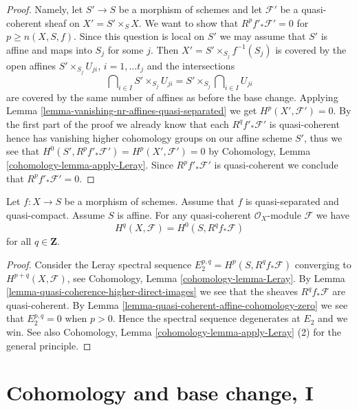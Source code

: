 \begin{proof}
\medskip\noindent
Namely, let $S' \to S$ be a morphism of schemes and let
$\mathcal{F}'$ be a quasi-coherent sheaf on $X' = S' \times_S X$.
We want to show that $R^pf'_*\mathcal{F}' = 0$ for $p \geq n(X, S, f)$.
Since this question is local on $S'$ we may assume that $S'$ is affine
and maps into $S_j$ for some $j$. Then $X' = S' \times_{S_j} f^{-1}(S_j)$
is covered by the open affines $S' \times_{S_j} U_{ji}$, $i = 1, \ldots t_j$
and the intersections
$$
\bigcap\nolimits_{i \in I} S' \times_{S_j} U_{ji} =
S' \times_{S_j} \bigcap\nolimits_{i \in I} U_{ji}
$$
are covered by the same number of affines as before the base change.
Applying
Lemma \ref{lemma-vanishing-nr-affines-quasi-separated}
we get $H^p(X', \mathcal{F}') = 0$. By the first part of the proof
we already know that each $R^qf'_*\mathcal{F}'$ is quasi-coherent
hence has vanishing higher cohomology groups on our affine scheme $S'$,
thus we see that $H^0(S', R^pf'_*\mathcal{F}') = H^p(X', \mathcal{F}') = 0$
by Cohomology, Lemma \ref{cohomology-lemma-apply-Leray}.
Since $R^pf'_*\mathcal{F}'$ is quasi-coherent
we conclude that $R^pf'_*\mathcal{F}' = 0$.
\end{proof}

\begin{lemma}
\label{lemma-quasi-coherence-higher-direct-images-application}
Let $f : X \to S$ be a morphism of schemes.
Assume that $f$ is quasi-separated and quasi-compact.
Assume $S$ is affine.
For any quasi-coherent $\mathcal{O}_X$-module $\mathcal{F}$
we have
$$
H^q(X, \mathcal{F}) = H^0(S, R^qf_*\mathcal{F})
$$
for all $q \in \mathbf{Z}$.
\end{lemma}

\begin{proof}
Consider the Leray spectral sequence $E_2^{p, q} = H^p(S, R^qf_*\mathcal{F})$
converging to $H^{p + q}(X, \mathcal{F})$, see
Cohomology, Lemma \ref{cohomology-lemma-Leray}.
By Lemma \ref{lemma-quasi-coherence-higher-direct-images}
we see that the sheaves $R^qf_*\mathcal{F}$ are quasi-coherent.
By Lemma \ref{lemma-quasi-coherent-affine-cohomology-zero}
we see that $E_2^{p, q} = 0$ when $p > 0$.
Hence the spectral sequence degenerates at $E_2$ and we win.
See also
Cohomology, Lemma \ref{cohomology-lemma-apply-Leray} (2)
for the general principle.
\end{proof}








\section{Cohomology and base change, I}
\label{section-cohomology-and-base-change}

